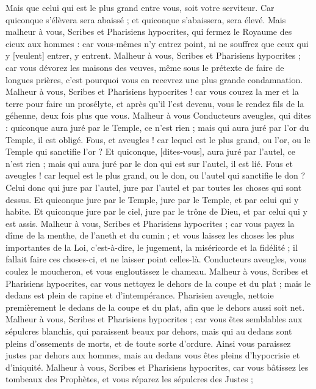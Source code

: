 \begin{multicols}{2}
Mais que celui qui est le plus grand entre vous, soit votre serviteur.
Car quiconque s'élèvera sera abaissé ; et quiconque s'abaissera, sera élevé.
Mais malheur à vous, Scribes et Pharisiens hypocrites, qui fermez le Royaume des cieux aux hommes : car vous-mêmes n'y entrez point, ni ne souffrez que ceux qui y [veulent] entrer, y entrent.
Malheur à vous, Scribes et Pharisiens hypocrites ; car vous dévorez les maisons des veuves, même sous le prétexte de faire de longues prières, c'est pourquoi vous en recevrez une plus grande condamnation.
Malheur à vous, Scribes et Pharisiens hypocrites ! car vous courez la mer et la terre pour faire un prosélyte, et après qu'il l'est devenu, vous le rendez fils de la géhenne, deux fois plus que vous.
Malheur à vous Conducteurs aveugles, qui dites : quiconque aura juré par le Temple, ce n'est rien ; mais qui aura juré par l'or du Temple, il est obligé.
Fous, et aveugles ! car lequel est le plus grand, ou l'or, ou le Temple qui sanctifie l'or ?
Et quiconque, [dites-vous], aura juré par l'autel, ce n'est rien ; mais qui aura juré par le don qui est sur l'autel, il est lié.
Fous et aveugles ! car lequel est le plus grand, ou le don, ou l'autel qui sanctifie le don ?
Celui donc qui jure par l'autel, jure par l'autel et par toutes les choses qui sont dessus.
Et quiconque jure par le Temple, jure par le Temple, et par celui qui y habite.
Et quiconque jure par le ciel, jure par le trône de Dieu, et par celui qui y est assis.
Malheur à vous, Scribes et Pharisiens hypocrites ; car vous payez la dîme de la menthe, de l'aneth et du cumin ; et vous laissez les choses les plus importantes de la Loi, c'est-à-dire, le jugement, la miséricorde et la fidélité ; il fallait faire ces choses-ci, et ne laisser point celles-là.
Conducteurs aveugles, vous coulez le moucheron, et vous engloutissez le chameau.
Malheur à vous, Scribes et Pharisiens hypocrites, car vous nettoyez le dehors de la coupe et du plat ; mais le dedans est plein de rapine et d'intempérance.
Pharisien aveugle, nettoie premièrement le dedans de la coupe et du plat, afin que le dehors aussi soit net.
Malheur à vous, Scribes et Pharisiens hypocrites ; car vous êtes semblables aux sépulcres blanchis, qui paraissent beaux par dehors, mais qui au dedans sont pleins d'ossements de morts, et de toute sorte d'ordure.
Ainsi vous paraissez justes par dehors aux hommes, mais au dedans vous êtes pleins d'hypocrisie et d'iniquité.
Malheur à vous, Scribes et Pharisiens hypocrites, car vous bâtissez les tombeaux des Prophètes, et vous réparez les sépulcres des Justes ;

\end{multicols}
